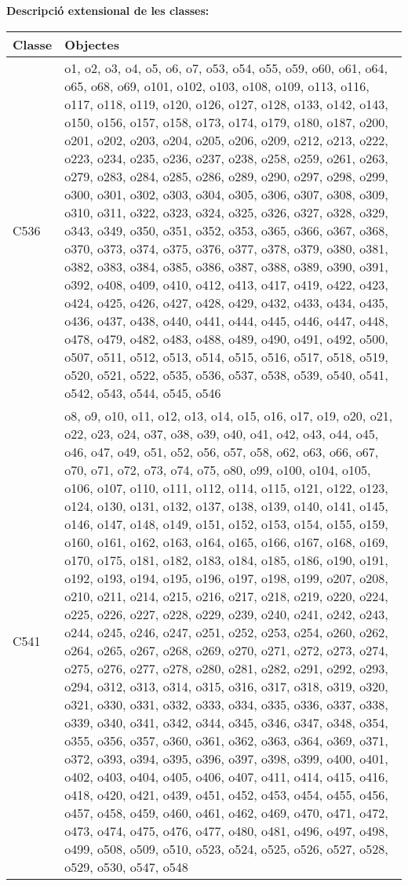 {\noindent \bf Descripci\'o extensional de les classes: }
\begin{center}
\begin{tabular}{|p{}|p{}|}
\hline
\bf Classe & \bf Objectes \\
\hline
C536 & o1, o2, o3, o4, o5, o6, o7, o53, o54, o55, o59, o60, o61, o64, o65, o68, o69, o101, o102, o103, o108, o109, o113, o116, o117, o118, o119, o120, o126, o127, o128, o133, o142, o143, o150, o156, o157, o158, o173, o174, o179, o180, o187, o200, o201, o202, o203, o204, o205, o206, o209, o212, o213, o222, o223, o234, o235, o236, o237, o238, o258, o259, o261, o263, o279, o283, o284, o285, o286, o289, o290, o297, o298, o299, o300, o301, o302, o303, o304, o305, o306, o307, o308, o309, o310, o311, o322, o323, o324, o325, o326, o327, o328, o329, o343, o349, o350, o351, o352, o353, o365, o366, o367, o368, o370, o373, o374, o375, o376, o377, o378, o379, o380, o381, o382, o383, o384, o385, o386, o387, o388, o389, o390, o391, o392, o408, o409, o410, o412, o413, o417, o419, o422, o423, o424, o425, o426, o427, o428, o429, o432, o433, o434, o435, o436, o437, o438, o440, o441, o444, o445, o446, o447, o448, o478, o479, o482, o483, o488, o489, o490, o491, o492, o500, o507, o511, o512, o513, o514, o515, o516, o517, o518, o519, o520, o521, o522, o535, o536, o537, o538, o539, o540, o541, o542, o543, o544, o545, o546 \\
\hline
C541 & o8, o9, o10, o11, o12, o13, o14, o15, o16, o17, o19, o20, o21, o22, o23, o24, o37, o38, o39, o40, o41, o42, o43, o44, o45, o46, o47, o49, o51, o52, o56, o57, o58, o62, o63, o66, o67, o70, o71, o72, o73, o74, o75, o80, o99, o100, o104, o105, o106, o107, o110, o111, o112, o114, o115, o121, o122, o123, o124, o130, o131, o132, o137, o138, o139, o140, o141, o145, o146, o147, o148, o149, o151, o152, o153, o154, o155, o159, o160, o161, o162, o163, o164, o165, o166, o167, o168, o169, o170, o175, o181, o182, o183, o184, o185, o186, o190, o191, o192, o193, o194, o195, o196, o197, o198, o199, o207, o208, o210, o211, o214, o215, o216, o217, o218, o219, o220, o224, o225, o226, o227, o228, o229, o239, o240, o241, o242, o243, o244, o245, o246, o247, o251, o252, o253, o254, o260, o262, o264, o265, o267, o268, o269, o270, o271, o272, o273, o274, o275, o276, o277, o278, o280, o281, o282, o291, o292, o293, o294, o312, o313, o314, o315, o316, o317, o318, o319, o320, o321, o330, o331, o332, o333, o334, o335, o336, o337, o338, o339, o340, o341, o342, o344, o345, o346, o347, o348, o354, o355, o356, o357, o360, o361, o362, o363, o364, o369, o371, o372, o393, o394, o395, o396, o397, o398, o399, o400, o401, o402, o403, o404, o405, o406, o407, o411, o414, o415, o416, o418, o420, o421, o439, o451, o452, o453, o454, o455, o456, o457, o458, o459, o460, o461, o462, o469, o470, o471, o472, o473, o474, o475, o476, o477, o480, o481, o496, o497, o498, o499, o508, o509, o510, o523, o524, o525, o526, o527, o528, o529, o530, o547, o548 \\

\end{tabular}
\end{center}
